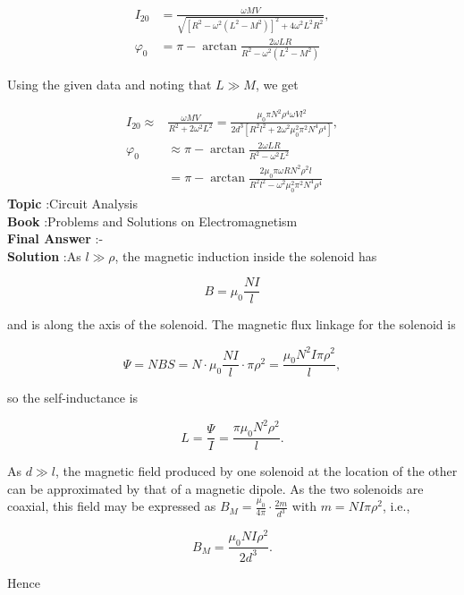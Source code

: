 \documentclass[10pt]{article}
\begin{document}
$$
\begin{aligned}
I_{20} &=\frac{\omega M V}{\sqrt{\left[R^{2}-\omega^{2}\left(L^{2}-M^{2}\right)\right]^{2}+4 \omega^{2} L^{2} R^{2}}}, \\
\varphi_{0} &=\pi-\arctan \frac{2 \omega L R}{R^{2}-\omega^{2}\left(L^{2}-M^{2}\right)}
\end{aligned}
$$

Using the given data and noting that $L \gg M$, we get

$$
\begin{aligned}
I_{20} \approx & \frac{\omega M V}{R^{2}+2 \omega^{2} L^{2}}=\frac{\mu_{0} \pi N^{2} \rho^{4} \omega V l^{2}}{2 d^{3}\left[R^{2} l^{2}+2 \omega^{2} \mu_{0}^{2} \pi^{2} N^{4} \rho^{4}\right]}, \\
\varphi_{0} & \approx \pi-\arctan \frac{2 \omega L R}{R^{2}-\omega^{2} L^{2}} \\
&=\pi-\arctan \frac{2 \mu_{0} \pi \omega R N^{2} \rho^{2} l}{R^{2} l^{2}-\omega^{2} \mu_{0}^{2} \pi^{2} N^{4} \rho^{4}}
\end{aligned}
$$
\textbf{Topic} :Circuit Analysis\\
\textbf{Book} :Problems and Solutions on Electromagnetism\\
\textbf{Final Answer} :\pi-\arctan {}\\


\textbf{Solution} :As $l \gg \rho$, the magnetic induction inside the solenoid has

$$
B=\mu_{0} \frac{N I}{l}
$$

and is along the axis of the solenoid. The magnetic flux linkage for the solenoid is

$$
\Psi=N B S=N \cdot \mu_{0} \frac{N I}{l} \cdot \pi \rho^{2}=\frac{\mu_{0} N^{2} I \pi \rho^{2}}{l},
$$

so the self-inductance is

$$
L=\frac{\Psi}{I}=\frac{\pi \mu_{0} N^{2} \rho^{2}}{l} .
$$

As $d \gg l$, the magnetic field produced by one solenoid at the location of the other can be approximated by that of a magnetic dipole. As the two solenoids are coaxial, this field may be expressed as $B_{M}=\frac{\mu_{0}}{4 \pi} \cdot \frac{2 m}{d^{3}}$ with $m=N I \pi \rho^{2}$, i.e.,

$$
B_{M}=\frac{\mu_{0} N I \rho^{2}}{2 d^{3}} .
$$

Hence
\end{document}
